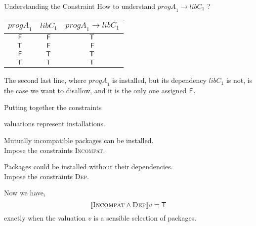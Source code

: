 \documentclass[xetex,aspectratio=169,14pt,hyperref={pdfpagelabels=true,pdflang={en-GB}}]{beamer}
\begin{document}
\begin{frame}
  {Understanding the Constraint}
  How to understand \quad
  $\mathit{progA}_1 \to \mathit{libC}_1$ \qquad ?

  \begin{center}
    \begin{tabular}{|c|c|c|}
      \hline
      $\mathit{progA}_1$&$\mathit{libC}_1$&$\mathit{progA}_1 \to \mathit{libC}_1$ \\
      \hline
      $\mathsf{F}$&$\mathsf{F}$&$\mathsf{T}$  \\
      $\mathsf{T}$ &$\mathsf{F}$&$\mathsf{F}$ \\
      $\mathsf{F}$&$\mathsf{T}$ &$\mathsf{T}$  \\
      $\mathsf{T}$ &$\mathsf{T}$ &$\mathsf{T}$ \\
      \hline
    \end{tabular}
  \end{center}
  The second last line, where $\mathit{progA}_1$ is installed, but its
  dependency $\mathit{libC}_1$ is not, is the case we want to
  disallow, and it is the only one assigned $\mathsf{F}$.



\end{frame}

\begin{frame}
  {Putting together the constraints}

   valuations represent installations. \\

  \pause
  \medskip

   Mutually incompatible packages can be installed. \\
  \pause
   Impose the constraints \textsc{Incompat}.

  \pause
  \medskip

   Packages could be installed without their dependencies. \\
  \pause
   Impose the constraints \textsc{Dep}.

  \pause
  \bigskip

  Now we have,
  \begin{displaymath}
    \llbracket \textsc{Incompat} \land \textsc{Dep} \rrbracket v = \mathsf{T}
  \end{displaymath}
  exactly when the valuation $v$ is a sensible selection of packages.
\end{frame}
\end{document}
